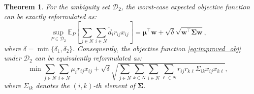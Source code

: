 \documentclass[preprint,12pt,authoryear]{elsarticle}
\newtheorem{theorem}{Theorem}
\begin{document}
\begin{theorem}\label{thm:d2_obj_reform}
For the ambiguity set $\mathcal{D}_2$, the worst-case expected objective function can be exactly reformulated as:
\begin{equation}
\sup_{P \in \mathcal{D}_2} \mathbb{E}_P\left[\sum_{j \in N} \sum_{i \in N} \widetilde{d}_i r_{ij} x_{ij}\right] = \boldsymbol{\mu}^\top \mathbf{w} + \sqrt{\delta} \sqrt{\mathbf{w}^\top \boldsymbol{\Sigma} \mathbf{w}},
\end{equation}
where $\delta = \min\{\delta_1, \delta_2\}$. Consequently, the objective function \eqref{eq:improved_obj} under $\mathcal{D}_2$ can be equivalently reformulated as:
\begin{equation}
\min \sum_{j \in N} \sum_{i \in N} \mu_i r_{ij} x_{ij} + \sqrt{\delta} \sqrt{\sum_{j \in N} \sum_{k \in N} \sum_{i \in N} \sum_{\ell \in N} r_{ij} r_{k\ell} \Sigma_{ik} x_{ij} x_{k\ell}}, \label{eq:improved_obj_d2}
\end{equation}
where $\Sigma_{ik}$ denotes the $(i,k)$-th element of $\boldsymbol{\Sigma}$.
\end{theorem}
\end{document}
